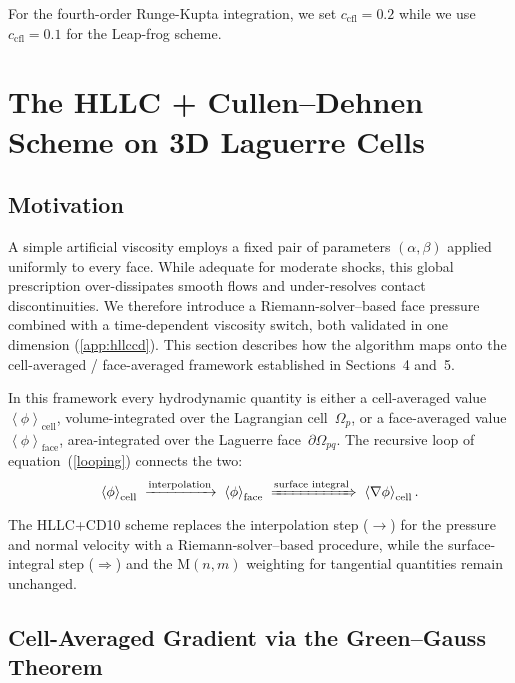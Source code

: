 \documentclass[twocolumn]{aastex63}
\begin{document}
For the fourth-order Runge-Kupta integration, we set $c_\textrm{cfl}=0.2$ while we use $c_\textrm{cfl}=0.1$ for the Leap-frog scheme.




\section{The HLLC + Cullen--Dehnen Scheme on 3D Laguerre Cells}
\label{sec:hllc3d}

\subsection{Motivation}

A simple artificial viscosity employs a fixed pair of
parameters $(\alpha,\beta)$ applied uniformly to every face.
While adequate for moderate shocks, this global prescription
over-dissipates smooth flows and under-resolves contact
discontinuities.
We therefore introduce a Riemann-solver--based face pressure
combined with a time-dependent viscosity switch, both validated
in one dimension (\ref{app:hllccd}).
This section describes how the algorithm maps onto the
cell-averaged / face-averaged framework established in Sections~4
and~5.

In this framework every hydrodynamic quantity is either a
cell-averaged value
$\left<\phi\right>_\textrm{cell}$, volume-integrated over the
Lagrangian cell~$\Omega_p$, or a face-averaged value
$\left<\phi\right>_\textrm{face}$, area-integrated over the
Laguerre face~$\partial\Omega_{pq}$.
The recursive loop of equation~(\ref{looping}) connects the two:
\begin{equation*}
  \left<\phi\right>_\textrm{cell}
    \;\xrightarrow{\text{interpolation}}\;
  \left<\phi\right>_\textrm{face}
    \;\xRightarrow{\text{surface integral}}\;
  \left<\nabla\phi\right>_\textrm{cell}.
\end{equation*}
The HLLC+CD10 scheme replaces the interpolation step
($\rightarrow$) for the pressure and normal velocity
with a Riemann-solver--based procedure, while the
surface-integral step ($\Rightarrow$) and the
M$(n,m)$ weighting for tangential quantities remain unchanged.


\subsection{Cell-Averaged Gradient via the Green--Gauss Theorem}
\end{document}
